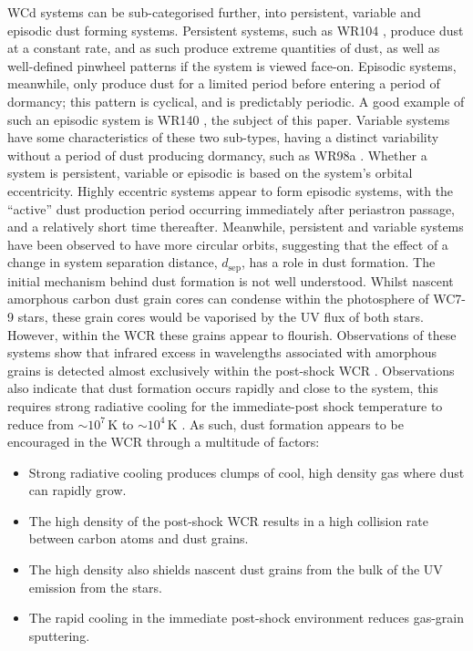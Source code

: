 \documentclass[fleqn,usenatbib]{mnras}
\newcommand{\rms}[1]{\ensuremath{_{\text{#1}}}}
\begin{document}
WCd systems can be sub-categorised further, into persistent, variable and episodic dust forming systems.
Persistent systems, such as WR104 \citep{tuthill_dusty_1999}, produce dust at a constant rate, and as such produce extreme quantities of dust, as well as well-defined pinwheel patterns if the system is viewed face-on.
Episodic systems, meanwhile, only produce dust for a limited period before entering a period of dormancy; this pattern is cyclical, and is predictably periodic.
A good example of such an episodic system is WR140 \citep{williamsMultifrequencyVariationsWolfrayet1990}, the subject of this paper.
Variable systems have some characteristics of these two sub-types, having a distinct variability without a period of dust producing dormancy, such as WR98a \citep{monnierPinwheelNebulaWR1999}.
Whether a system is persistent, variable or episodic is based on the system's orbital eccentricity.
Highly eccentric systems appear to form episodic systems, with the ``active'' dust production period occurring immediately after periastron passage, and a relatively short time thereafter.
Meanwhile, persistent and variable systems have been observed to have more circular orbits, suggesting that the effect of a change in system separation distance, $d\rms{sep}$, has a role in dust formation.
The initial mechanism behind dust formation is not well understood.
Whilst nascent amorphous carbon dust grain cores can condense within the photosphere of WC7-9 stars,
these grain cores would be vaporised by the UV flux of both stars.
However, within the WCR these grains appear to flourish.
Observations of these systems show that infrared excess in wavelengths associated with amorphous grains is detected almost exclusively within the post-shock WCR \citep{soulainSPHEREViewWolfRayet2018}.
Observations also indicate that dust formation occurs rapidly and close to the system, this requires strong radiative cooling for the immediate-post shock temperature to reduce from $\sim 10^7 \, \si{\kelvin}$ to $\sim 10^4 \, \si{\kelvin}$
\citep{williamsInfraredPhotometryLatetype1987,williamsMultifrequencyVariationsWolfrayet1990}.
As such, dust formation appears to be encouraged in the WCR through a multitude of factors:

\begin{itemize}
  \item Strong radiative cooling produces clumps of cool, high density gas where dust can rapidly grow.
  \item The high density of the post-shock WCR results in a high collision rate between carbon atoms and dust grains.
  \item The high density also shields nascent dust grains from the bulk of the UV emission from the stars.
  \item The rapid cooling in the immediate post-shock environment reduces gas-grain sputtering.
\end{itemize}
\end{document}
